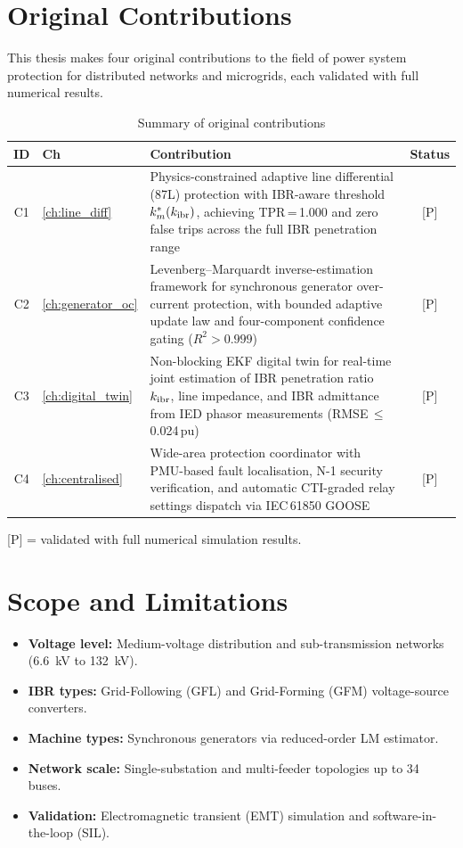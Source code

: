 \section{Original Contributions}
\label{sec:ch1_contributions}

This thesis makes four original contributions to the field of power system
protection for distributed networks and microgrids, each validated with
full numerical results.

\begin{table}[htbp]
\caption{Summary of original contributions}
\label{tab:ch1_contributions}
\small
\begin{tabularx}{\textwidth}{@{}clp{9.5cm}c@{}}
\toprule
ID & Ch & Contribution & Status \\
\midrule
C1  & \ref{ch:line_diff}
  & Physics-constrained adaptive line differential (87L) protection
    with IBR-aware threshold $k_m^*(k_\mathrm{ibr})$, achieving TPR\,=\,1.000
    and zero false trips across the full IBR penetration range
  & [P] \\[4pt]
C2  & \ref{ch:generator_oc}
  & Levenberg--Marquardt inverse-estimation framework for synchronous
    generator over-current protection, with bounded adaptive update law
    and four-component confidence gating ($R^2 > 0.999$)
  & [P] \\[4pt]
C3  & \ref{ch:digital_twin}
  & Non-blocking EKF digital twin for real-time joint estimation of
    IBR penetration ratio $k_\mathrm{ibr}$, line impedance, and IBR admittance
    from IED phasor measurements (RMSE\,$\leq$\,0.024\,pu)
  & [P] \\[4pt]
C4  & \ref{ch:centralised}
  & Wide-area protection coordinator with PMU-based fault localisation,
    N-1 security verification, and automatic CTI-graded relay
    settings dispatch via IEC\,61850 GOOSE
  & [P] \\
\bottomrule
\end{tabularx}
\vspace{2pt}
{\footnotesize [P] = validated with full numerical simulation results.}
\end{table}

\section{Scope and Limitations}
\label{sec:ch1_scope}

\begin{itemize}
\item \textbf{Voltage level:} Medium-voltage distribution and sub-transmission
      networks (6.6~kV to 132~kV).
\item \textbf{IBR types:} Grid-Following (GFL) and Grid-Forming (GFM)
      voltage-source converters.
\item \textbf{Machine types:} Synchronous generators via reduced-order
      LM estimator.
\item \textbf{Network scale:} Single-substation and multi-feeder topologies up
      to 34 buses.
\item \textbf{Validation:} Electromagnetic transient (EMT) simulation
      and software-in-the-loop (SIL).
\end{itemize}


